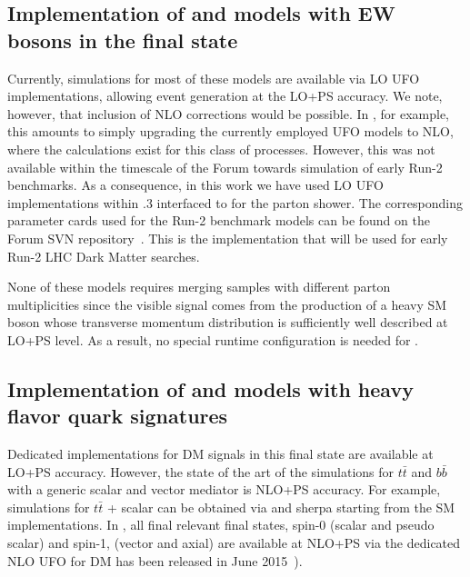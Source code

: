 \subsection{Implementation of \schannel and  \tchannel models with EW bosons in the final state}
\label{sec:EW_implementation}

Currently, simulations for most of these models are available via LO UFO implementations, allowing event generation at the LO+PS accuracy. We note, however, that inclusion of NLO corrections would be possible. In \madgraph, for example, this amounts to simply upgrading the currently employed UFO models to NLO, where the calculations exist for this class of processes. However, this was not available within the timescale of the Forum towards simulation of early Run-2 benchmarks. As a consequence, in this work we have used LO UFO implementations within .3 interfaced to \pythiaEight for the parton shower. The corresponding parameter cards used for the Run-2 benchmark models can be found on the Forum SVN repository~\cite{ForumSVN_EW_DMV}. This is the implementation that will be used for early Run-2 LHC Dark Matter searches.

None of these models requires merging samples with different parton multiplicities  
since the visible signal comes from the production of a heavy SM boson whose transverse momentum distribution is sufficiently 
well described at LO+PS level.  As a result, no special runtime configuration is needed for \pythiaEight. 

\subsection{\texorpdfstring{Implementation of \schannel and \tchannel models with heavy flavor quark signatures}{Simulations for models with heavy flavor quark signatures}}
\label{sec:TTBar_implementation}

Dedicated implementations for DM signals in this final state are available at LO+PS accuracy. 
However, the state of the art of the simulations for $t \bar{t}$ and $b \bar{b}$ with a generic scalar and vector mediator is NLO+PS accuracy. For example, simulations for $t \bar{t}$ + scalar can be obtained via \powheg and {\sc sherpa} starting from the SM implementations. In \madgraph,  all final relevant final states, spin-0 (scalar and pseudo scalar) and spin-1, (vector and axial) are available  at NLO+PS via the dedicated NLO UFO for DM has been released in June 2015~\cite{NewMadgraphModels}).

